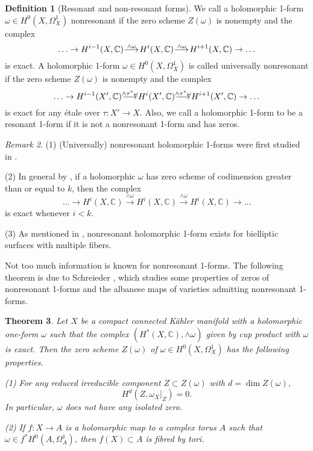\documentclass[a4paper,12pt,reqno]{amsart}
\makeatletter
\newtheorem{theorem}{Theorem}[section]
\theoremstyle{plain}
\theoremstyle{definition}
\newtheorem{definition}[theorem]{Definition}
\theoremstyle{remark}
\newtheorem{remark}[theorem]{Remark}
\newcommand{\C}{\mathbb C}
\renewcommand{\longrightarrow}{\xymatrix@1@=15pt{\ar[r]&}}
\makeatother
\begin{document}
\begin{definition}[Resonant and non-resonant forms]\label{def:resonance}
We call a holomorphic 1-form $\omega\in H^0(X, \Omega_X^1)$ nonresonant if the zero scheme $Z(\omega)$ is nonempty and the complex $$\ldots\to H^{i-1}(X,\C)\overset{\wedge\omega}{\longrightarrow}H^{i}(X,\C)\overset{\wedge\omega}{\longrightarrow}H^{i+1}(X,\C)\to\ldots$$ is exact. A holomorphic 1-form $\omega\in H^0(X, \Omega_X^1)$ is called universally nonresonant if the zero scheme $Z(\omega)$ is nonempty and the complex $$\ldots\to H^{i-1}(X',\C)\overset{\wedge\tau^*\omega}{\longrightarrow}H^{i}(X',\C)\overset{\wedge\tau^*\omega}{\longrightarrow}H^{i+1}(X',\C)\to\ldots$$ is exact for any \'etale over $\tau: X'\to X$. Also, we call a holomorphic 1-form to be a resonant 1-form if it is not a nonresonant 1-form and has zeros.
\end{definition}

\begin{remark}

(1) (Universally) nonresonant  holomorphic 1-forms were first studied in \cite{SS19}.

(2) In general by \cite[Proposition 3.4]{GL87}, if a holomorphic $\omega$ has zero scheme of codimension greater than or equal to $k$, then the complex $$\ldots\to H^{i}(X,\C)\overset{\wedge\omega}{\rightarrow}H^{i}(X,\C)\overset{\wedge\omega}{\rightarrow}H^{i}(X,\C)\to\ldots$$ is exact whenever $i<k.$ 

 
(3) As mentioned in \cite[1.6]{SS19}, nonresonant holomorphic 1-form exists for bielliptic surfaces with multiple fibers. 
\end{remark}

Not too much information is known for nonresonant 1-forms. The following theorem is due to Schreieder \cite{SS19}, which studies some properties of zeros of nonresonant 1-forms and the albanese maps of varieties admitting nonresonant 1-forms.

\begin{theorem} \label{thm:stefan}
Let $X$ be a compact connected K\"ahler manifold with a holomorphic one-form $\omega$ such that the complex $(H^*(X, \C), \wedge\omega)$ given by cup product with $\omega$ is exact. Then
the zero scheme $Z(\omega)$ of $\omega\in H^0(X,\Omega_X^1)$ has the following properties.

(1) For any reduced irreducible component $Z \subset Z(\omega)$ with $d=\dim Z(\omega)$, $$H^d(Z, \omega_X|_Z)=0.$$
In particular, $\omega$ does not have any isolated zero.

(2) If $f : X \to A$ is a holomorphic map to a complex torus $A$ such that $\omega \in f^*H^0(A, \Omega^1_A)$,
then $f(X)\subset A$ is fibred by tori.
\end{theorem}
\end{document}
